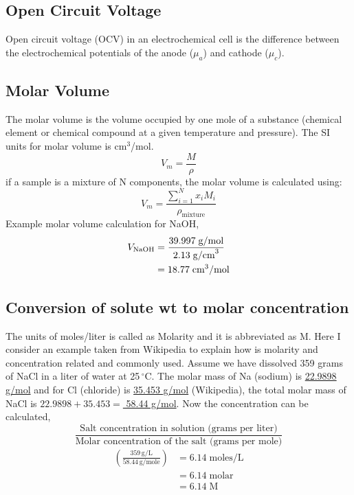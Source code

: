 \documentclass[12pt]{book}
\begin{document}
\subsection{Open Circuit Voltage}
Open circuit voltage (OCV) in an electrochemical cell is the difference between the electrochemical potentials of the anode ($\mu_a $) and cathode ($\mu_c$).

\subsection{Molar Volume}
The molar volume is the volume occupied by one mole of a substance (chemical element or chemical compound at a given temperature and pressure). The SI units for molar volume is cm$^3$/mol.
\begin{equation}
V_m = \frac{M}{\rho}
\end{equation}
if a sample is a mixture of N components, the molar volume is calculated using:
\begin{equation}
V_m = \frac{\sum_{i = 1}^{N}x_iM_i}{\rho_{\textrm{mixture}}}
\end{equation}
Example molar volume calculation for NaOH,
\begin{align}
V_{\ce{NaOH}}    &= \frac{39.997\;\textrm{g/mol}}{2.13\;\textrm{g/cm}^3}\\
&=18.77\;\textrm{cm}^3\textrm{/mol}
\end{align}

\subsection{Conversion of solute wt to molar concentration}
The units of moles/liter is called as Molarity and it is abbreviated as M. 
Here I consider an example taken from Wikipedia to explain how is molarity and concentration related and commonly used.
Assume we have dissolved 359 grams of NaCl in a liter of water at 25$\,^\circ$C. The molar mass of Na (sodium) is \underline{22.9898 g/mol} and for Cl (chloride) is \underline{35.453 g/mol} (Wikipedia), the total molar mass of NaCl is $22.9898+35.453=$\underline{ 58.44 g/mol}.
Now the concentration can be calculated,
\begin{equation}
\frac{\textrm{Salt concentration in solution (grams per liter)}}{\textrm{Molar concentration of the salt (grams per mole)}}
\end{equation}
\begin{align}
\left(\frac{359\,\textrm{g/L}}{58.44\,\textrm{g/mole}}\right) &=6.14\;\textrm{moles/L}\nonumber\\
&=6.14\;\textrm{molar}\nonumber\\
&=6.14\;\textrm{M}\nonumber
\end{align} 
\end{document}
